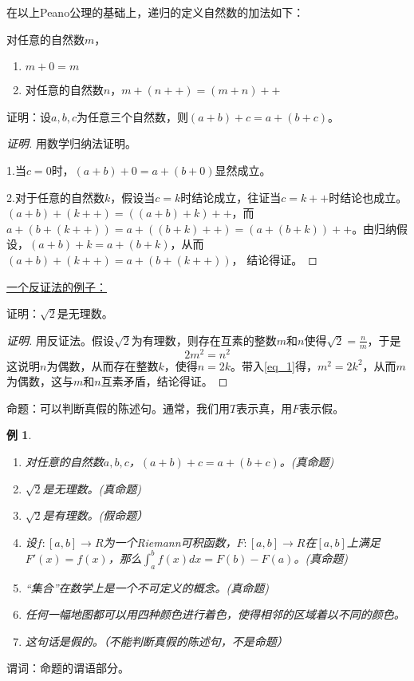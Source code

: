\documentclass{article}
\newtheorem*{Example}{例}
\begin{document}
\begin{CJK}{UTF8}{gbsn}
    在以上Peano公理的基础上，递归的定义自然数的加法如下：
    
    对任意的自然数$m$，
    \begin{enumerate}
    \item $m + 0 = m$
    \item 对任意的自然数$n$，$m + (n++) = (m + n)++$
    \end{enumerate}
    证明：设$a, b, c$为任意三个自然数，则$(a + b) + c = a + (b + c)$。

\begin{proof}[证明]
  用数学归纳法证明。

  1.当$c=0$时，$(a+b)+0=a+(b+0)$显然成立。

  2.对于任意的自然数$k$，假设当$c=k$时结论成立，往证当$c=k++$时结论也成立。$(a+b)+(k++)=((a+b)+k)++$，而$a+(b+(k++))=a+((b+k)++)=(a+(b+k))++$。由归纳假设，$(a+b)+k=a+(b+k)$，从而$(a+b)+(k++)=a+(b+(k++))$，  结论得证。
\end{proof}

\underline{一个反证法的例子：}

证明：$\sqrt{2}$是无理数。
\begin{proof}[证明]
  用反证法。假设$\sqrt{2}$为有理数，则存在互素的整数$m$和$n$使得$\sqrt{2}=\frac{n}{m}$，于是
  \begin{equation}\label{eq_1}
    2m^2=n^2
  \end{equation}
  这说明$n$为偶数，从而存在整数$k$，使得$n=2k$。带入\eqref{eq_1}得，$m^2=2k^2$，从而$m$为偶数，这与$m$和$n$互素矛盾，结论得证。
\end{proof}
  命题：可以判断真假的陈述句。通常，我们用$T$表示真，用$F$表示假。
  \begin{Example}\quad
    
    \begin{enumerate}
    \item 对任意的自然数$a,b,c$，$(a + b) + c = a + (b + c)$。(真命题)
    \item $\sqrt{2}$是无理数。(真命题)
    \item $\sqrt{2}$是有理数。(假命题）
    \item 设$f:[a,b] \to R$为一个Riemann可积函数，$F:[a,b] \to R$在$[a,b]$上满足$F'(x)=f(x)$，那么$\int_{a}^{b}f(x)dx = F(b) - F(a)$。(真命题)
    \item “集合”在数学上是一个不可定义的概念。(真命题)
    \item 任何一幅地图都可以用四种颜色进行着色，使得相邻的区域着以不同的颜色。
    \item 这句话是假的。（不能判断真假的陈述句，不是命题）
    \end{enumerate}
  \end{Example}
  谓词：命题的谓语部分。
  

\end{CJK}
\end{document}
